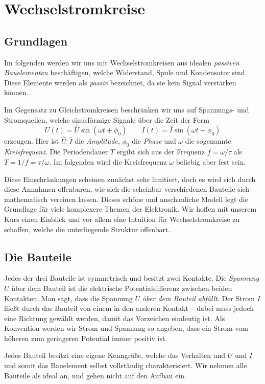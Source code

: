 \section{Wechselstromkreise}
\subsection{Grundlagen}
Im folgenden werden wir uns mit Wechselstromkreisen aus idealen \emph{passiven Bauelementen} beschäftigen, welche Widerstand, Spule und Kondensator sind. Diese Elemente werden als \emph{passiv} bezeichnet, da sie kein Signal verstärken können.

Im Gegensatz zu Gleichstromkreisen beschränken wir uns auf Spannungs- und Stromquellen, welche sinusförmige Signale über die Zeit der Form
\begin{equation}\label{eq:sinusform}
    U(t) = \hat U\sin(\omega t + \phi_0) \qquad
    I(t) = \hat I\sin(\omega t + \phi_0)
\end{equation}
erzeugen. Hier ist $\hat U, \hat I$ die \emph{Amplitude}, $\phi_0$ die \emph{Phase} und  $\omega$ die sogenannte \emph{Kreisfrequenz}. Die Periodendauer $T$ ergibt sich aus der Frequenz $f = \omega/\tau$ als $T = 1/f = \tau/\omega$.
Im folgenden wird die Kreisfrequenz $\omega$ beliebig aber fest sein.

Diese Einschränkungen scheinen zunächst sehr limitiert, doch es wird sich durch diese Annahmen offenbaren, wie sich die scheinbar verschiedenen Bauteile sich mathematisch vereinen lassen. Dieses schöne und anschauliche Modell legt die Grundlage für viele komplexere Themen der Elektronik. Wir hoffen mit unserem Kurs einen Einblick und vor allem eine Intuition für Wechselstromkreise zu schaffen, welche die unterliegende Struktur offenbart.

\subsection{Die Bauteile}
Jedes der drei Bauteile ist symmetrisch und besitzt zwei Kontakte. Die \emph{Spannung} $U$ über dem Bauteil ist die elektrische Potentialdifferenz zwischen beiden Kontakten. Man sagt, dass die Spannung $U$ \emph{über dem Bauteil abfällt}. Der Strom $I$ fließt durch das Bauteil von einem in den anderen Kontakt -- dabei muss jedoch eine Richtung gewählt werden, damit das Vorzeichen eindeutig ist. Als Konvention werden wir Strom und Spannung so angeben, dass ein Strom vom höheren zum geringeren Potential immer positiv ist.

Jedes Bauteil besitzt eine eigene Kenngröße, welche das Verhalten und $U$ und $I$ und somit das Bauelement selbst vollständig charakterisiert. Wir nehmen alle Bauteile als ideal an, und gehen nicht auf den Aufbau ein.
